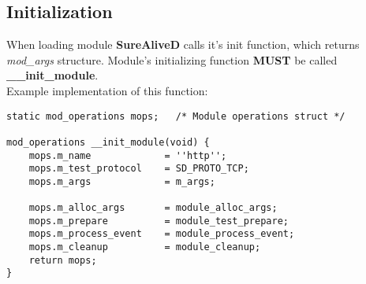 \documentclass[polish,12pt]{article}
\begin{document}
\subsection{Initialization}
When loading module \textbf{SureAliveD} calls it's init function, which returns
\textit{mod\_args} structure. Module's initializing function \textbf{MUST} be called
\textbf{\_\_init\_module}.\\
Example implementation of this function:
{\small
\begin{verbatim}
static mod_operations mops;   /* Module operations struct */

mod_operations __init_module(void) {
    mops.m_name             = ''http'';
    mops.m_test_protocol    = SD_PROTO_TCP;
    mops.m_args             = m_args;

    mops.m_alloc_args       = module_alloc_args;
    mops.m_prepare          = module_test_prepare;
    mops.m_process_event    = module_process_event;
    mops.m_cleanup          = module_cleanup;
    return mops;
}
\end{verbatim}
}
\end{document}
